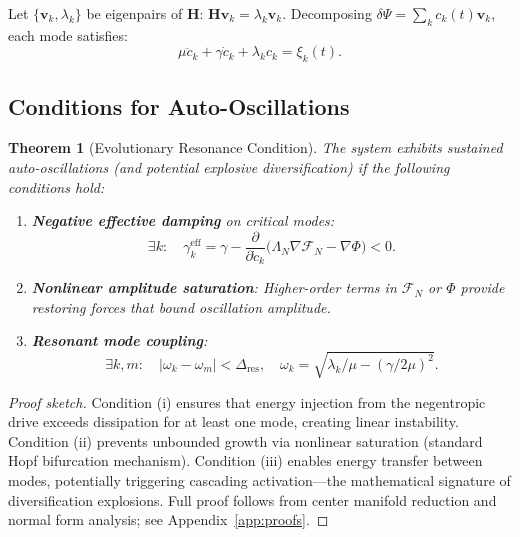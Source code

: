 \documentclass[11pt,a4paper]{article}
\theoremstyle{plain}
\newtheorem{theorem}{Theorem}[section]
\theoremstyle{definition}
\theoremstyle{remark}
\newcommand{\Foam}{\Phi}
\newcommand{\Functional}{\mathcal{F}}
\newcommand{\grad}{\nabla}
\begin{document}
Let $\{\mathbf{v}_k, \lambda_k\}$ be eigenpairs of $\mathbf{H}$: $\mathbf{H} \mathbf{v}_k = \lambda_k \mathbf{v}_k$. Decomposing $\delta\Psi = \sum_k c_k(t) \mathbf{v}_k$, each mode satisfies:
\begin{equation}
\mu \ddot{c}_k + \gamma \dot{c}_k + \lambda_k c_k = \xi_k(t).
\label{eq:mode_equation}
\end{equation}

\subsection{Conditions for Auto-Oscillations}

\begin{theorem}[Evolutionary Resonance Condition]
\label{thm:resonance}
The system exhibits sustained auto-oscillations (and potential explosive diversification) if the following conditions hold:
\begin{enumerate}[label=(\roman*)]
    \item \textbf{Negative effective damping} on critical modes:
    \begin{equation}
    \exists k: \quad \gamma_k^{\text{eff}} = \gamma - \frac{\partial}{\partial \dot{c}_k}\Big(\Lambda_N \grad\Functional_N - \grad\Foam\Big) < 0.
    \label{eq:negative_damping}
    \end{equation}
    
    \item \textbf{Nonlinear amplitude saturation}: Higher-order terms in $\Functional_N$ or $\Foam$ provide restoring forces that bound oscillation amplitude.
    
    \item \textbf{Resonant mode coupling}:
    \begin{equation}
    \exists k,m: \quad |\omega_k - \omega_m| < \Delta_{\text{res}}, \quad \omega_k = \sqrt{\lambda_k/\mu - (\gamma/2\mu)^2}.
    \label{eq:mode_coupling}
    \end{equation}
\end{enumerate}
\end{theorem}

\begin{proof}[Proof sketch]
Condition (i) ensures that energy injection from the negentropic drive exceeds dissipation for at least one mode, creating linear instability. Condition (ii) prevents unbounded growth via nonlinear saturation (standard Hopf bifurcation mechanism). Condition (iii) enables energy transfer between modes, potentially triggering cascading activation---the mathematical signature of diversification explosions. Full proof follows from center manifold reduction and normal form analysis; see Appendix~\ref{app:proofs}.
\end{proof}
\end{document}
